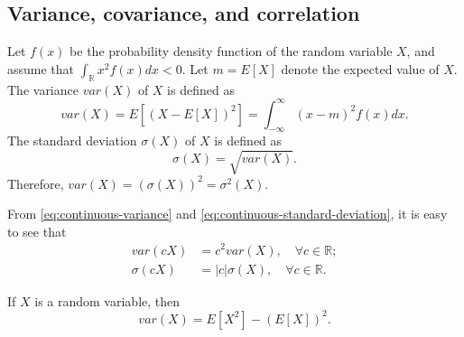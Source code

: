 \subsection{Variance, covariance, and correlation}
\begin{definition}
    Let $ f(x) $ be the probability density function of the random variable
        $ X $, and assume that $ \int_{\mathbb{R}} x^2 f(x) dx < 0 $.
    Let $ m = E[X] $ denote the expected value of $ X $.
    The variance $ var(X) $ of $ X $ is defined as
    \begin{equation}
        var(X) = E[(X - E[X])^2] = \int_{-\infty}^{\infty} (x - m)^2 f(x) dx.
        \label{eq:continuous-variance}
    \end{equation}
    The standard deviation $ \sigma(X) $ of $ X $ is defined as
    \begin{equation}
        \sigma(X) = \sqrt{var(X)}.
        \label{eq:continuous-standard-deviation}
    \end{equation}
    Therefore, $ var(X) = (\sigma(X))^2 = \sigma^2(X) $.
\end{definition}

From \eqref{eq:continuous-variance} and
    \eqref{eq:continuous-standard-deviation}, it is easy to see that
\begin{align}
    var(c X) &= c^2 var(X), \quad \forall c \in \mathbb{R}; \\
    \sigma(c X) &= |c| \sigma(X), \quad \forall c \in \mathbb{R}.
\end{align}

\begin{lemma}
    If $ X $ is a random variable, then
    \begin{equation*}
        var(X) = E[X^2] - (E[X])^2.
    \end{equation*}
\end{lemma}
